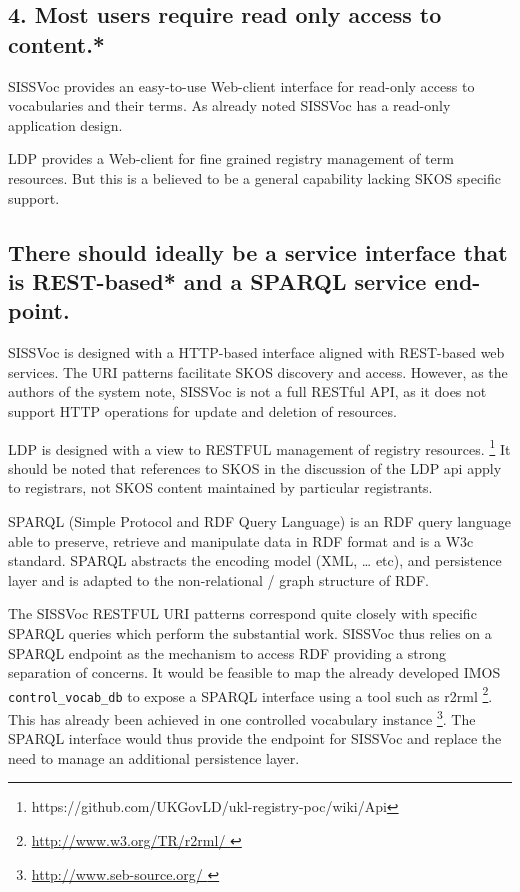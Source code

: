 \documentclass[10pt,a4paper]{article}
\begin{document}
\begin{flushleft}
\subsection{ 
  4. Most users require read only access to content.* 
}
  \item SISSVoc provides an easy-to-use Web-client interface for read-only access to 
  vocabularies and their terms.  As already noted SISSVoc has a read-only application design.
 
  \item LDP provides a Web-client for fine grained registry management of term
resources. But this is a believed to be a general capability lacking SKOS specific support.


\subsection{ 
  There should ideally be a service interface that is REST-based* and a SPARQL service end-point.
}

   \item SISSVoc is designed with a HTTP-based interface aligned with
REST-based web services. The URI patterns facilitate SKOS discovery and access.
However, as the authors of the system note, SISSVoc is not a full RESTful API, as 
it does not support HTTP operations for update and deletion of resources.
    
  \item  LDP is designed with a view to RESTFUL management of registry
resources.  \footnote { https://github.com/UKGovLD/ukl-registry-poc/wiki/Api }
It should be noted that references to SKOS in the discussion of the LDP api
apply to registrars, not SKOS content maintained by particular registrants.  

    \item SPARQL (Simple Protocol and RDF Query Language) is an RDF query
language able to preserve, retrieve and manipulate data in RDF format and is a
W3c standard.  SPARQL abstracts the encoding model (XML, … etc), and
persistence layer and is adapted to the non-relational / graph structure of
RDF.

 \item   The SISSVoc RESTFUL URI patterns correspond quite closely with
specific SPARQL queries which perform the substantial work. SISSVoc thus relies
on a SPARQL endpoint as the mechanism to access RDF providing a strong
separation of concerns. It would be feasible to map the already developed IMOS
\texttt{control\_vocab\_db} to expose a SPARQL interface using a tool such as
r2rml \footnote{ \url{ http://www.w3.org/TR/r2rml/ } }. This has already been
achieved in one controlled vocabulary instance \footnote{ \url{ http://www.seb-source.org/ } }. 
The SPARQL interface would thus provide the endpoint for SISSVoc and replace the 
need to manage an additional persistence layer.


\end{flushleft}
\end{document}
